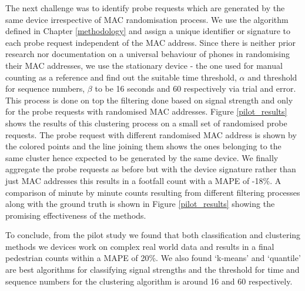The next challenge was to identify probe requests which are generated by the same device irrespective of MAC randomisation process.
We use the algorithm defined in Chapter \ref{methodology} and assign a unique identifier or signature to each probe request independent of the MAC address. 
Since there is neither prior research nor documentation on a universal behaviour of phones in randomising their MAC addresses, we use the stationary device - the one used for manual counting as a reference and find out the suitable time threshold, $\alpha$ and threshold for sequence numbers, $\beta$ to be 16 seconds and 60 respectively via trial and error.
This process is done on top the filtering done based on signal strength and only for the probe requests with randomised MAC addresses.
Figure \ref{pilot_results} shows the results of this clustering process on a small set of randomised probe requests.
The probe request with different randomised MAC address is shown by the colored points and the line joining them shows the ones belonging to the same cluster hence expected to be generated by the same device.
We finally aggregate the probe requests as before but with the device signature rather than just MAC addresses this results in a footfall count with a MAPE of -18\%. 
A comparison of minute by minute counts resulting from different filtering processes along with the ground truth is shown in Figure \ref{pilot_results} showing the promising effectiveness of the methods.

To conclude, from the pilot study we found that both classification and clustering methods we devices work on complex real world data and results in a final pedestrian counts within a MAPE of 20\%. We also found `k-means' and `quantile' are best algorithms for classifying signal strengths and the threshold for time and sequence numbers for the clustering algorithm is around 16 and 60 respectively.
